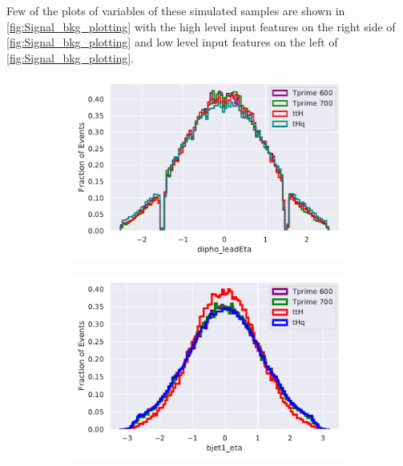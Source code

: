 Few of the plots of variables of these simulated samples are shown in \autoref{fig:Signal_bkg_plotting} with the high level input features on the right side of \autoref{fig:Signal_bkg_plotting} and low level input features on the left of \autoref{fig:Signal_bkg_plotting}.
\begin{figure}[H]
\begin{subfigure}{.5\textwidth}
  \centering
  \includegraphics[width=.8\linewidth]{Figure_2/dipho_leadEta.pdf}  
  \caption{}
  \label{fig:sub-first}
\end{subfigure}
\begin{subfigure}{.5\textwidth}
  \centering
  \includegraphics[width=.8\linewidth]{Figure_2/bjet1_eta.pdf}  
  \caption{}
  \label{fig:sub-second}
\end{subfigure}




\end{figure}
